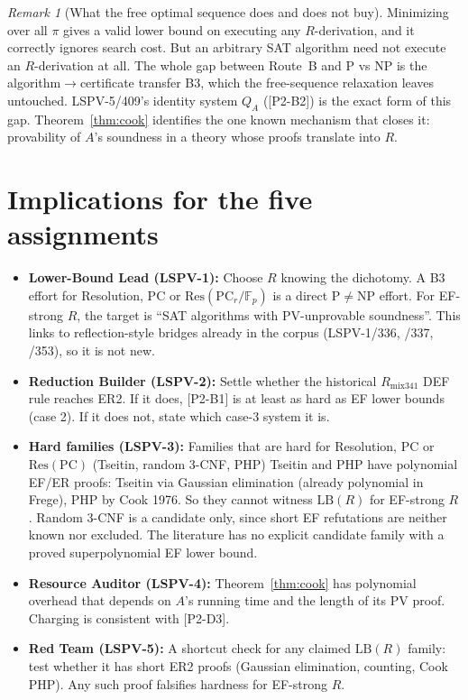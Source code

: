 \documentclass[11pt]{article}
\theoremstyle{remark}\newtheorem{remark}[theorem]{Remark}
\begin{document}
\begin{remark}[What the free optimal sequence does and does not buy]
Minimizing over all $\pi$ gives a valid lower bound on executing any $R$-derivation, and it
correctly ignores search cost. But an arbitrary SAT algorithm need not execute an
$R$-derivation at all. The whole gap between Route~B and P vs NP is the
algorithm$\to$certificate transfer B3, which the free-sequence relaxation leaves untouched.
LSPV-5/409's identity system $Q_A$ ([P2-B2]) is the exact form of this gap.
Theorem~\ref{thm:cook} identifies the one known mechanism that closes it: provability of
$A$'s soundness in a theory whose proofs translate into $R$.
\end{remark}

\section{Implications for the five assignments}
\begin{itemize}
\item \textbf{Lower-Bound Lead (LSPV-1):} Choose $R$ knowing the dichotomy. A B3 effort for
Resolution, PC or $\mathrm{Res}(\mathrm{PC}_r/\mathbb F_p)$ is a direct P$\ne$NP effort.
For EF-strong $R$, the target is ``SAT algorithms with PV-unprovable soundness''. This links to
reflection-style bridges already in the corpus (LSPV-1/336, /337, /353), so it is not new.
\item \textbf{Reduction Builder (LSPV-2):} Settle whether the historical $R_{\mathrm{mix341}}$ DEF rule
reaches ER2. If it does, [P2-B1] is at least as hard as EF lower bounds (case 2). If it does not,
state which case-3 system it is.
\item \textbf{Hard families (LSPV-3):} Families that are hard for Resolution, PC or $\mathrm{Res}(\mathrm{PC})$
(Tseitin, random 3-CNF, PHP) Tseitin and PHP have polynomial EF/ER proofs: Tseitin via Gaussian elimination
(already polynomial in Frege), PHP by Cook 1976. So they cannot witness $\mathrm{LB}(R)$ for
EF-strong $R$. Random 3-CNF is a candidate only, since short EF refutations are neither known nor excluded. The literature has no explicit candidate family with a proved
superpolynomial EF lower bound.
\item \textbf{Resource Auditor (LSPV-4):} Theorem~\ref{thm:cook} has polynomial overhead that depends on
$A$'s running time and the length of its PV proof. Charging is consistent with [P2-D3].
\item \textbf{Red Team (LSPV-5):} A shortcut check for any claimed $\mathrm{LB}(R)$ family:
test whether it has short ER2 proofs (Gaussian elimination, counting, Cook PHP). Any such
proof falsifies hardness for EF-strong $R$.
\end{itemize}
\end{document}
